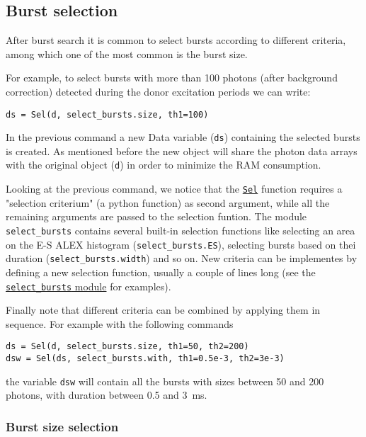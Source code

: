 \subsection{Burst selection}
\label{sec:burstsel}

After burst search it is common to select bursts according to different criteria, among which one of the most common is the burst size.

For example, to select bursts with more than 100 photons (after background correction) detected during the donor excitation periods we can write:

\begin{verbatim}
ds = Sel(d, select_bursts.size, th1=100)
\end{verbatim}

In the previous command a new Data variable (\verb|ds|) containing the selected bursts is created. As mentioned before the new object will share the photon data arrays with the original object (\verb|d|) in order to minimize the RAM consumption.

Looking at the previous command, we notice that the \href{http://fretbursts.readthedocs.org/en/latest/burst_selection.html#fretbursts.burstlib.Sel}{\verb|Sel|} function requires a "selection criterium" (a python function) as second argument, while all the remaining arguments are passed to the selection funtion. The module \verb|select_bursts| contains several built-in selection functions like
selecting an area on the E-S ALEX histogram (\verb|select_bursts.ES|), 
selecting bursts based on thei duration (\verb|select_bursts.width|) and so on. New criteria can be implementes by defining a new selection function, usually a couple of lines long (see the \href{https://github.com/tritemio/FRETBursts/blob/master/fretbursts/select_bursts.py}{\verb|select_bursts| module} for examples).

Finally note that different criteria can be combined by applying them
in sequence. For example with the following commands

\begin{verbatim}
ds = Sel(d, select_bursts.size, th1=50, th2=200)
dsw = Sel(ds, select_bursts.with, th1=0.5e-3, th2=3e-3)
\end{verbatim}

the variable \verb|dsw| will contain all the bursts with sizes between 50 and 200 photons, with duration between 0.5 and 3~ms.

\subsubsection{Burst size selection}

